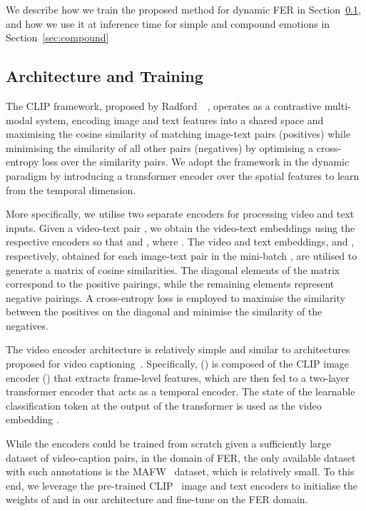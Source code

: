 \documentclass[10pt,twocolumn,letterpaper]{article}
\begin{document}
We describe how we train the proposed method for dynamic FER in Section~\ref{subsec:proposed}, and how we use it at inference time for simple and compound emotions in Section~\ref{sec:compound}

\subsection{Architecture and Training}
\label{subsec:proposed}
The CLIP framework, proposed by Radford~\etal~\cite{radford_CLIP_2021}, operates as a contrastive multi-modal system, encoding image and text features into a shared space and maximising the cosine similarity of matching image-text pairs (positives) while minimising the similarity of all other pairs (negatives) by optimising a cross-entropy loss over the similarity pairs. We adopt the framework in the dynamic paradigm by introducing a transformer encoder over the spatial features to learn from the temporal dimension.

More specifically, we utilise two separate encoders for processing video and text inputs. Given a video-text pair , we obtain the video-text embeddings using the respective encoders so that  and , where . The video and text embeddings,  and , respectively, obtained for each image-text pair in the mini-batch , are utilised to generate a  matrix of cosine similarities. The diagonal elements of the matrix correspond to the  positive pairings, while the remaining elements represent  negative pairings. A cross-entropy loss is employed to maximise the similarity between the positives on the diagonal and minimise the similarity of the negatives. 

The video encoder architecture is relatively simple and similar to architectures proposed for video captioning~\cite{ma_x-clip_2022, tang_clip4caption_2021}. Specifically, () is composed of the CLIP image encoder () that extracts frame-level features, which are then fed to a two-layer transformer encoder that acts as a temporal encoder. The state of the learnable classification token at the output of the transformer is used as the video embedding . 

While the encoders  could be trained from scratch given a sufficiently large dataset of video-caption pairs, in the domain of FER, the only available dataset with such annotations is the MAFW~\cite{liu_mafw_2022} dataset, which is relatively small. To this end, we leverage the pre-trained CLIP~\cite{radford_CLIP_2021} image and text encoders to initialise the weights of  and  in our architecture and fine-tune on the FER domain.
\end{document}
